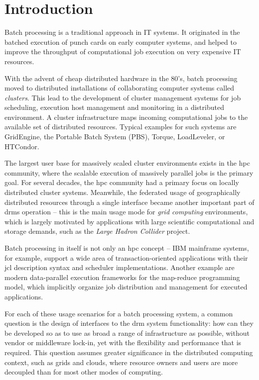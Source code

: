 \documentclass[twocolumn]{svjour3}       %
\begin{document}
\sloppy

\section{Introduction}
\label{intro}

Batch processing is a traditional approach in IT systems. It originated in the batched execution of punch cards on early computer systems, and helped to improve the throughput of computational job execution on very expensive IT resources.  

 With the advent of cheap distributed hardware in the 80's, batch processing moved to distributed installations of collaborating computer systems called \emph{clusters}. This lead to the development of cluster management systems for job scheduling, execution host management and monitoring in a distributed environment. A cluster infrastructure maps incoming computational jobs to the available set of distributed resources. Typical examples for such systems are GridEngine, the Portable Batch System (PBS), Torque, LoadLeveler, or HTCondor.  

 The largest user base for massively scaled cluster environments exists in the \gls{hpc} community, where the scalable execution of massively parallel jobs is the primary goal. For several decades, the \gls{hpc} community had a primary focus on locally distributed cluster systems. Meanwhile, the federated usage of geographically distributed resources through a single interface became another important part of \gls{drms} operation -- this is the main usage mode for \emph{grid computing} environments, which is largely motivated by applications with large scientific computational and storage demands, such as the \emph{Large Hadron Collider} project. 

 Batch processing in itself is not only an \gls{hpc} concept -- IBM mainframe systems, for example, support a wide area of transaction-oriented applications with their \gls{jcl} description syntax and scheduler implementations. Another example are modern data-parallel execution frameworks for the map-reduce programming model, which implicitly organize job distribution and management for executed applications.

For each of these usage scenarios for a batch processing system, a common question is the design of interfaces to the \gls{drm} system functionality: how can they be developed so as to use as broad a range of infrastructure as possible, without vendor or middleware lock-in, yet with the flexibility and performance that is required. This question assumes greater significance in the distributed computing context, such as grids and clouds, where resource owners and users are more decoupled than for most other modes of computing.
\end{document}
